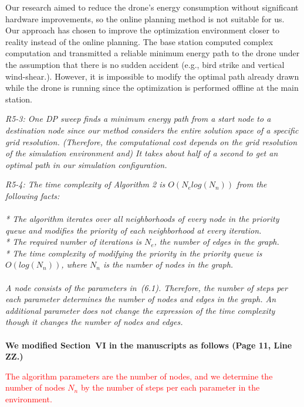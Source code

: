 \documentclass[onecolumn]{IEEEconf}
\begin{document}
\begin{description}
{	Our research aimed to reduce the drone’s energy consumption without significant hardware improvements, so the online planning method is not suitable for us. 
    Our approach has chosen to improve the optimization environment closer to reality instead of the online planning. 
    The base station computed complex computation and transmitted a reliable minimum energy path to the drone under the assumption that there is no sudden accident (e.g., bird strike and vertical wind-shear.).
    However, it is impossible to modify the optimal path already drawn while the drone is running since the optimization is performed offline at the main station.
	}
	~\\
	\item \textit
	{
	R5-3: One DP sweep finds a minimum energy path from a start node to a destination node since our method considers the entire solution space of a specific grid resolution. (Therefore, the computational cost depends on the grid resolution of the simulation environment and) It takes about half of a second to get an optimal path in our simulation configuration.
	}
	~\\
	\item \textit
	{
	R5-4: The time complexity of Algorithm 2 is $O(N_elog(N_n))$ from the following facts:~\\~\\
    * The algorithm iterates over all neighborhoods of every node in the priority queue and modifies the priority of each neighborhood at every iteration.~\\
    * The required number of iterations is $N_e$, the number of edges in the graph. ~\\
    * The time complexity of modifying the priority in the priority queue is $O(log(N_n))$, where $N_n$ is the number of nodes in the graph.~\\~\\
    A node consists of the parameters in~(6.1). Therefore, the number of steps per each parameter determines the number of nodes and edges in the graph. An additional parameter does not change the expression of the time complexity though it changes the number of nodes and edges.
	}
	~\\
    ~\\
	\textbf{We modified Section~VI in the manuscripts as follows (Page 11, Line ZZ.)}\\
    \begin{mdframed}[ linewidth=.75pt, userdefinedwidth=0.9\textwidth]
    \textcolor{red}{
    The algorithm parameters are the number of nodes, and we determine the number of nodes $N_n$ by the number of steps per each parameter in the environment.  
}
\end{mdframed}
\end{description}
\end{document}
